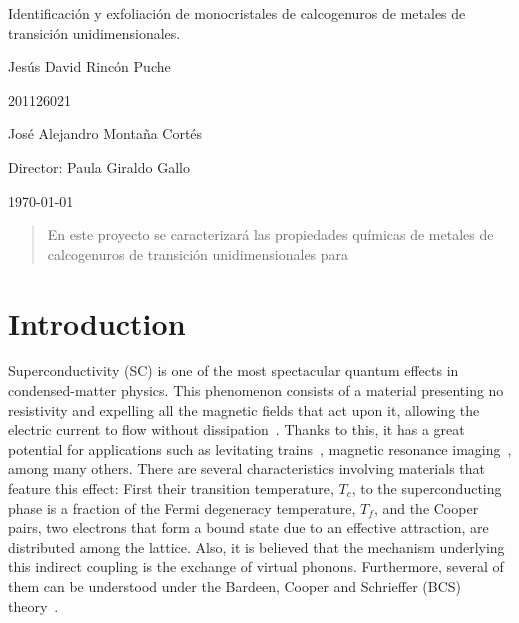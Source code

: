 \documentclass{article}
\begin{document}
\begin{center}
\Huge
Identificación y exfoliación de monocristales de calcogenuros de metales de transición unidimensionales.

\vspace{3mm}
\Large Jesús David Rincón Puche

\large
201126021

\Large José Alejandro Montaña Cortés
\large 


\vspace{2mm}
\Large
Director: Paula Giraldo Gallo\\


\normalsize
\vspace{2mm}

\today
\end{center}

\begin{abstract}
 En este proyecto se caracterizará las propiedades químicas de metales de calcogenuros de transición unidimensionales para 
\end{abstract}

\normalsize
\section{Introduction}

Superconductivity (SC) is one of the most spectacular quantum effects in condensed-matter physics. This phenomenon consists of a material presenting no resistivity and expelling all the magnetic fields that act upon it, allowing the electric current to flow without dissipation~\cite{Leggett}. Thanks to this, it has a great potential for applications such as levitating trains~\cite{Trains}, magnetic resonance imaging~\cite{Resonance}, among many others. There are several characteristics involving 
materials that feature this effect: First their transition temperature, $T_c$, to the superconducting phase is a fraction of the Fermi degeneracy temperature, $T_f$, and the Cooper pairs, two electrons that form a bound state due to an effective attraction, are distributed among the lattice. Also, it is believed that the mechanism underlying this indirect coupling is the exchange of virtual phonons. Furthermore, several of them can be understood under the Bardeen, Cooper and Schrieffer (BCS) theory~\cite{PhysRev.108.1175}.
\end{document}
